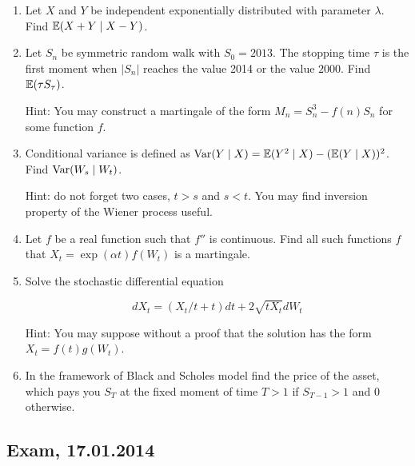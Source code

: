 \documentclass[pdftex,12pt,a4paper]{article}
\begin{document}
\begin{enumerate}

\item Let $X$ and $Y$ be independent exponentially distributed with parameter $\lambda$. Find $\mathbb{E}(X+Y \mid X-Y)$.

\item Let $S_n$ be symmetric random walk with $S_0=2013$. The stopping time $\tau$ is the first moment when $|S_n|$ reaches the value 2014 or the value $2000$. Find $\mathbb{E}(\tau S_{\tau})$.

Hint: You may construct a martingale of the form $M_n=S_n^3-f(n)S_n$ for some function $f$.

\item Conditional variance is defined as $\operatorname{Var}(Y \mid X)=\mathbb{E}(Y^2 \mid X) - (\mathbb{E}(Y \mid X) )^2$. Find $\operatorname{Var}(W_s \mid W_t)$. 

Hint: do not forget two cases, $t>s$ and $s<t$. You may find inversion property of the Wiener process useful.

\item Let $f$ be a real function such that $f''$ is continuous. Find all such functions $f$ that $X_t=\exp(\alpha t)f(W_t)$ is a martingale. 

\item Solve the stochastic differential equation 

\[
dX_t=(X_t/t+t)dt+2\sqrt{tX_t}dW_t
\]

Hint: You may suppose without a proof that the solution has the form $X_t=f(t)g(W_t)$. 

\item In the framework of Black and Scholes model find the price of the asset, which pays you $S_T$ at the fixed moment of time $T>1$ if $S_{T-1}>1$ and $0$ otherwise.
  

\end{enumerate}





\subsection{Exam, 17.01.2014}
\end{document}
